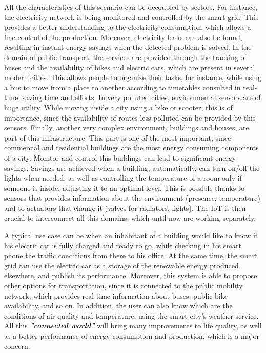 All the characteristics of this scenario can be decoupled by sectors.
For instance, the electricity network is being monitored and controlled by the smart grid\todo{\cite{}}.
This provides a better understanding to the electricity consumption, which allows a fine control of the production.
Moreover, electricity leaks can also be found, resulting in instant energy savings when the detected problem is solved.
In the domain of public transport, the services are provided through the tracking of buses and the availability of bikes and electric cars, which are present in several modern cities.
This allows people to organize their tasks, for instance, while using a bus to move from a place to another according to timetables consulted in real-time, saving time and efforts.
In very polluted cities, environmental sensors are of huge utility.
While moving inside a city using a bike or scooter, this is of importance, since the availability of routes less polluted can be provided by this sensors.
Finally, another very complex environment, buildings and houses, are part of this infrastructure.
This part is one of the most important, since commercial and residential buildings are the most energy consuming components of a city\cite{perezLombard2008energy}.
Monitor and control this buildings can lead to significant energy savings.
Savings are achieved when a building, automatically, can turn on/off the lights when needed, as well as controlling the temperature of a room only if someone is inside, adjusting it to an optimal level.
This is possible thanks to sensors that provides information about the environment (presence, temperature) and to actuators that change it (valves for radiators, lights).
The IoT is then crucial to interconnect all this domains, which until now are working separately. 


A typical use case can be when an inhabitant of a building would like to know if his electric car is fully charged and ready to go, while checking in his smart phone the traffic conditions from there to his office.
At the same time, the smart grid can use the electric car as a storage of the renewable energy produced elsewhere, and publish its performance.
Moreover, this system is able to propose other options for transportation, since it is connected to the public mobility network, which provides real time information about buses, public bike availability, and so on.
In addition, the user can also know which are the conditions of air quality and temperature, using the smart city's weather service.
All this \textit{\textbf{"connected world"}} will bring many improvements to life quality, as well as a better performance of energy consumption and production, which is a major concern.

